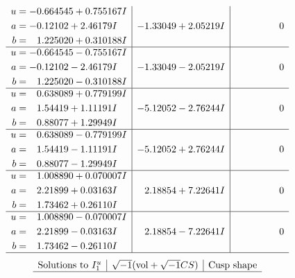 \documentclass[1p]{elsarticle_modified}
\theoremstyle{definition}
\newcommand{\I}{\sqrt{-1}}
\begin{document}
$$\begin{array}{c|c|c}
\begin{aligned}
u &= -0.664545 + 0.755167 I \\
a &= -0.12102 + 2.46179 I \\
b &= \phantom{-}1.225020 + 0.310188 I\end{aligned}
 & -1.33049 + 2.05219 I & \phantom{-0.000000 } 0 \\ \hline\begin{aligned}
u &= -0.664545 - 0.755167 I \\
a &= -0.12102 - 2.46179 I \\
b &= \phantom{-}1.225020 - 0.310188 I\end{aligned}
 & -1.33049 - 2.05219 I & \phantom{-0.000000 } 0 \\ \hline\begin{aligned}
u &= \phantom{-}0.638089 + 0.779199 I \\
a &= \phantom{-}1.54419 + 1.11191 I \\
b &= \phantom{-}0.88077 + 1.29949 I\end{aligned}
 & -5.12052 - 2.76244 I & \phantom{-0.000000 } 0 \\ \hline\begin{aligned}
u &= \phantom{-}0.638089 - 0.779199 I \\
a &= \phantom{-}1.54419 - 1.11191 I \\
b &= \phantom{-}0.88077 - 1.29949 I\end{aligned}
 & -5.12052 + 2.76244 I & \phantom{-0.000000 } 0 \\ \hline\begin{aligned}
u &= \phantom{-}1.008890 + 0.070007 I \\
a &= \phantom{-}2.21899 + 0.03163 I \\
b &= \phantom{-}1.73462 + 0.26110 I\end{aligned}
 & \phantom{-}2.18854 + 7.22641 I & \phantom{-0.000000 } 0 \\ \hline\begin{aligned}
u &= \phantom{-}1.008890 - 0.070007 I \\
a &= \phantom{-}2.21899 - 0.03163 I \\
b &= \phantom{-}1.73462 - 0.26110 I\end{aligned}
 & \phantom{-}2.18854 - 7.22641 I & \phantom{-0.000000 } 0\\
 \hline 
 \end{array}$$\newpage$$\begin{array}{c|c|c}  
\text{Solutions to }I^u_{1}& \I (\text{vol} + \sqrt{-1}CS) & \text{Cusp shape}\\
 \hline 

\end{array}$$
\end{document}
